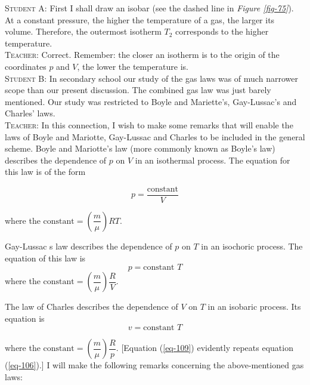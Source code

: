 \documentclass[a4paper,sfsidenotes]{tufte-book}
\begin{document}
\textsc{Student A:} First I shall draw an isobar (see the dashed line in \emph{Figure \ref{fig-75}}). At a constant pressure, the higher the temperature of a gas, the larger its volume. Therefore, the outermost isotherm $T_{2}$ corresponds to the higher temperature.
\\
\textsc{Teacher:} Correct. Remember: the closer an isotherm is to the origin of the coordinates $p$ and $V$, the lower the temperature is.
\\
\textsc{Student B:} In secondary school our study of the gas laws was of much narrower scope than our present discussion. The combined gas law was just barely mentioned. Our study was restricted to Boyle and Mariette's, Gay-Lussac's and Charles' laws.
\\
\textsc{Teacher:} In this connection, I wish to make some remarks that will enable the laws of Boyle and Mariotte, Gay-Lussac and Charles to be included in the general scheme. Boyle and Mariotte's law (more commonly known as Boyle's law) describes the dependence of $p$ on $V$ in an isothermal process. The equation for this law is of the form

\begin{equation}%
p=\frac{\text{constant}}{V}
\label{107}
\end{equation}

where the $\text{constant}= \left( \dfrac{m}{\mu} \right) RT$.

Gay-Lussac s law describes the dependence of $p$ on $T$ in an isochoric process. The equation of this law is
\begin{equation}%
p=\text{constant} \,\,T
\label{108}
\end{equation}
where the $\text{constant}= \left( \dfrac{m}{\mu} \right) \dfrac{R}{V}$.

The law of Charles describes the dependence of $V$ on $T$ in an isobaric process. Its equation is
\begin{equation}%
v=\text{constant} \,\,T
\label{109}
\end{equation}

where the $\text{constant}= \left( \dfrac{m}{\mu} \right) \dfrac{R}{p}$. [Equation (\ref{eq-109}) evidently repeats equation (\ref{eq-106}).] I will make the following remarks concerning the above-mentioned gas laws:
\end{document}
